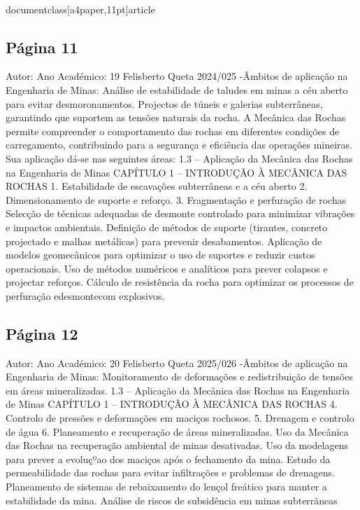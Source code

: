 \\documentclass[a4paper,11pt]{article}
\begin{document}
\subsection*{Página 11}
Autor:
Ano Académico:
19
Felisberto Queta
2024/025
-Âmbitos de aplicação na Engenharia de Minas:
Análise de estabilidade de taludes em minas a céu aberto para evitar
desmoronamentos.
Projectos de túneis e galerias subterrâneas, garantindo que suportem as 
tensões naturais da rocha.
A Mecânica das Rochas permite compreender o comportamento das rochas em diferentes condições de carregamento, 
contribuindo para a segurança e eficiência das operações mineiras. Sua aplicação dá-se nas seguintes áreas:
1.3 – Aplicação da Mecânica das Rochas na Engenharia de Minas
CAPÍTULO 1 – INTRODUÇÃO À MECÂNICA DAS ROCHAS
1. Estabilidade de escavações subterrâneas e 
a céu aberto
2. Dimensionamento de suporte e reforço.
3. Fragmentação e perfuração de rochas
Selecção de técnicas adequadas de desmonte controlado para minimizar 
vibrações e impactos ambientais.
Definição de métodos de suporte (tirantes, concreto projectado e malhas
metálicas) para prevenir desabamentos.
Aplicação de modelos geomecânicos para optimizar o uso de suportes e 
reduzir custos operacionais.
Uso de métodos numéricos e analíticos para prever colapsos e projectar
reforços.
Cálculo de resistência da rocha para optimizar os processos de 
perfuração edesmontecom explosivos.



\subsection*{Página 12}
Autor:
Ano Académico:
20
Felisberto Queta
2025/026
-Âmbitos de aplicação na Engenharia de Minas:
Monitoramento de deformações e redistribuição de tensões em áreas 
mineralizadas.
1.3 – Aplicação da Mecânica das Rochas na Engenharia de Minas
CAPÍTULO 1 – INTRODUÇÃO À MECÂNICA DAS ROCHAS
4. Controlo de pressões e deformações em 
maciços rochosos.
5. Drenagem e controlo de água
6. Planeamento e recuperação de áreas 
mineralizadas.
Uso da Mecânica das Rochas na recuperação ambiental de minas 
desativadas.
Uso da modelagens para prever a evoluçºao dos maciços após o 
fechamento da mina.
Estudo
da
permeabilidade
das
rochas
para
evitar
infiltrações
e
problemas de drenagens.
Planeamento de sistemas de rebaixamento do lençol freático para 
manter a estabilidade da mina.
Análise de riscos de subsidência em minas subterrãneas
\end{document}
